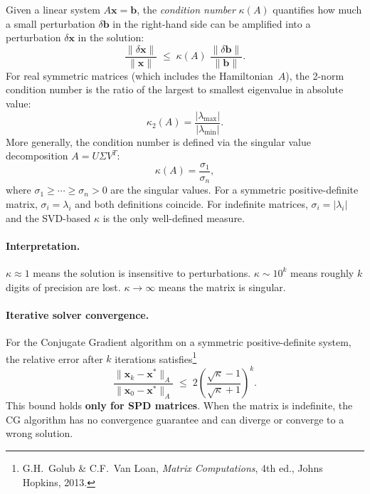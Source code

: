 \documentclass[12pt,a4paper]{article}
\begin{document}
Given a linear system $A\mathbf{x} = \mathbf{b}$, the \emph{condition number}
$\kappa(A)$ quantifies how much a small perturbation $\delta\mathbf{b}$ in the
right-hand side can be amplified into a perturbation $\delta\mathbf{x}$ in
the solution:
\begin{equation}
  \frac{\|\delta\mathbf{x}\|}{\|\mathbf{x}\|}
  \;\leq\; \kappa(A)\;\frac{\|\delta\mathbf{b}\|}{\|\mathbf{b}\|}.
  \label{eq:kappa_bound}
\end{equation}
For real symmetric matrices (which includes the Hamiltonian~$A$),
the 2-norm condition number is the ratio of the largest to smallest
eigenvalue in absolute value:
\begin{equation}
  \kappa_2(A) = \frac{|\lambda_\text{max}|}{|\lambda_\text{min}|}.
  \label{eq:kappa_eig}
\end{equation}
More generally, the condition number is defined via the singular value
decomposition $A = U\Sigma V^T$:
\begin{equation}
  \kappa(A) = \frac{\sigma_1}{\sigma_n},
  \label{eq:kappa_svd}
\end{equation}
where $\sigma_1 \geq \cdots \geq \sigma_n > 0$ are the singular values.
For a symmetric positive-definite matrix, $\sigma_i = \lambda_i$ and both
definitions coincide.
For indefinite matrices, $\sigma_i = |\lambda_i|$ and the SVD-based
$\kappa$ is the only well-defined measure.

\paragraph{Interpretation.}
$\kappa \approx 1$ means the solution is insensitive to perturbations.
$\kappa \sim 10^k$ means roughly $k$ digits of precision are lost.
$\kappa \to \infty$ means the matrix is singular.

\paragraph{Iterative solver convergence.}
For the Conjugate Gradient algorithm on a symmetric positive-definite
system, the relative error after $k$ iterations satisfies\footnote{G.H.\ Golub \& C.F.\ Van Loan, \emph{Matrix Computations}, 4th ed., Johns Hopkins, 2013.}
\begin{equation}
  \frac{\|\mathbf{x}_k - \mathbf{x}^*\|_A}
       {\|\mathbf{x}_0 - \mathbf{x}^*\|_A}
  \;\leq\; 2\left(\frac{\sqrt{\kappa} - 1}{\sqrt{\kappa} + 1}\right)^{\!k}.
  \label{eq:cg_convergence}
\end{equation}
This bound holds \textbf{only for SPD matrices}.
When the matrix is indefinite, the CG algorithm has no convergence
guarantee and can diverge or converge to a wrong solution.
\end{document}
